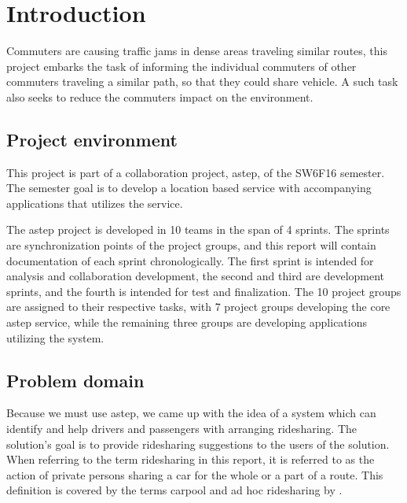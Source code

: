 \chapter{Introduction}\label{ch:introduction}


Commuters are causing traffic jams in dense areas traveling similar routes, this project embarks the task of informing the individual commuters of other commuters traveling a similar path, so that they could share vehicle.
A such task also seeks to reduce the commuters impact on the environment.


\section{Project environment}
This project is part of a collaboration project, \gls{astep}, of the SW6F16 semester.
The semester goal is to develop a location based service with accompanying applications that utilizes the service. 

The \gls{astep} project is developed in 10 teams in the span of 4 sprints.
The sprints are synchronization points of the project groups, and this report will contain documentation of each sprint chronologically.
The first sprint is intended for analysis and collaboration development, the second and third are development sprints, and the fourth is intended for test and finalization.
The 10 project groups are assigned to their respective tasks, with 7 project groups developing the core \gls{astep} service, while the remaining three groups are developing applications utilizing the system.



\section{Problem domain}
Because we must use \gls{astep}, we came up with the idea of a system which can identify and help drivers and passengers with arranging ridesharing.
The solution's goal is to provide ridesharing suggestions to the users of the solution.
When referring to the term ridesharing in this report, it is referred to as the action of private persons sharing a car for the whole or a part of a route. 
This definition is covered by the terms carpool and ad hoc ridesharing by \citet{doi:10.1080/01441647.2011.621557}.  

